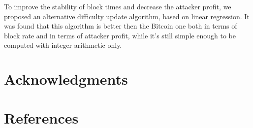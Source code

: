 \documentclass[]{llncs}
\begin{document}
To improve the stability of block times and decrease the attacker profit, we proposed an alternative difficulty update algorithm, based on linear regression.
It was found that this algorithm is better then the Bitcoin one both in terms of block rate and in terms of attacker profit, while it's still simple enough to be computed with integer arithmetic only.

\section*{Acknowledgments}

\section*{References}



\end{document}
